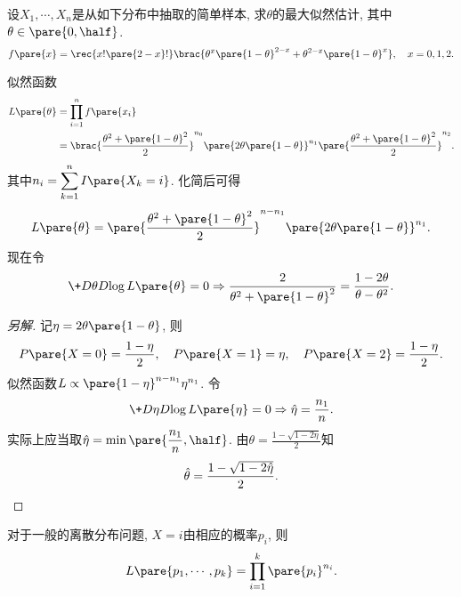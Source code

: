 \documentclass{ctexart}
\begin{document}
\begin{sample}
    \begin{ex}
        设$X_1,\cdots,X_n$是从如下分布中抽取的简单样本, 求$\theta$的最大似然估计, 其中$\displaystyle \theta\in\pare{0,\half}$.
        \[ f\pare{x} = \rec{x!\pare{2-x}!} \brac{\theta^x \pare{1-\theta}^{2-x} + \theta^{2-x}\pare{1-\theta}^x},\quad x=0,1,2. \]
    \end{ex}
    \begin{solution}
        似然函数
        \begin{align*}
            L\pare{\theta} &= \prod_{i=1}^n f\pare{x_i} \\
            &= \brac{\frac{\theta^2 + \pare{1-\theta}^2}{2}}^{n_0} \pare{2\theta\pare{1-\theta}}^{n_1}\pare{\frac{\theta^2 + \pare{1-\theta}^2}{2}}^{n_2}.
        \end{align*}
        其中$n_i = \displaystyle \sum_{k=1}^n I\pare{X_k=i}$. 化简后可得
        \[ L\pare{\theta} = \pare{\frac{\theta^2 + \pare{1-\theta}^2}{2}}^{n-n_1} \pare{2\theta\pare{1-\theta}}^{n_1}. \]
        现在令
        \[ \+D{\theta}D{\log L\pare{\theta}} = 0 \Rightarrow \frac{2}{\theta^2 + \pare{1-\theta}^2} = \frac{1-2\theta}{\theta-\theta^2}. \]
    \end{solution}
    \begin{proof}[另解]
        记$\eta = 2\theta\pare{1-\theta}$, 则
        \[ P\pare{X=0} = \frac{1-\eta}{2},\quad P\pare{X=1} = \eta,\quad P\pare{X=2} = \frac{1-\eta}{2}. \]
        似然函数$L \propto \pare{1-\eta}^{n-n_1}\eta^{n_1}$. 令
        \[ \+D{\eta}D{\log L\pare{\eta}} = 0 \Rightarrow \hat{\eta} = \frac{n_1}{n}. \]
        实际上应当取$\hat\eta = \displaystyle \min\pare{\frac{n_1}{n}, \half}$. 由$\theta = \frac{1-\sqrt{1-2\eta}}{2}$知
        \[ \hat\theta = \frac{1-\sqrt{1-2\hat\eta}}{2}. \qedhere \]
    \end{proof}
\end{sample}
\begin{remark}
    对于一般的离散分布问题, $X = i$由相应的概率$p_i$, 则
    \[ L\pare{p_1,\cdots,p_k} = \prod_{i=1}^k \pare{p_i}^{n_i}. \]
\end{remark}
\end{document}
